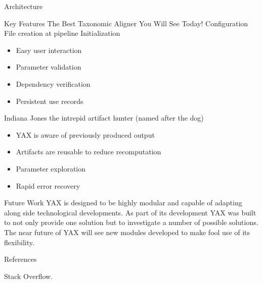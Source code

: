 \documentclass[final,t]{beamer}
\begin{document}
\begin{frame}{}
\begin{columns}[t]
\begin{column}{.3\linewidth}
\begin{block}{Architecture}
        \end{block}
        \begin{block}{Key Features}
            The Best Taxonomic Aligner You Will See Today!
            Configuration File creation at pipeline Initialization
            \begin{itemize}
              \item[$\bullet$]Easy user interaction
              \item[$\bullet$]Parameter validation
              \item[$\bullet$]Dependency verification
              \item[$\bullet$]Persistent use records
            \end{itemize}
            Indiana Jones the intrepid artifact hunter (named after the dog)
            \begin{itemize}
              \item[$\bullet$]YAX is aware of previously produced output
              \item[$\bullet$]Artifacts are reusable to reduce recomputation
              \item[$\bullet$]Parameter exploration
              \item[$\bullet$]Rapid error recovery
            \end{itemize}
        \end{block}
        \begin{block}{Future Work}
            YAX is designed to be highly modular and capable of adapting along side technological developments. As part of its development
            YAX was built to not only provide one solution but to investigate a number of possible solutions. The near future of YAX will
            see new modules developed to make fool use of its flexibility.

        \end{block}
        \begin{block}{References}
            \begin{itemize}
              {\small
              \item[1]Stack Overflow.
              }
          \end{itemize}
        \end{block}





    \end{column}
  \end{columns}

\end{frame}
\end{document}
